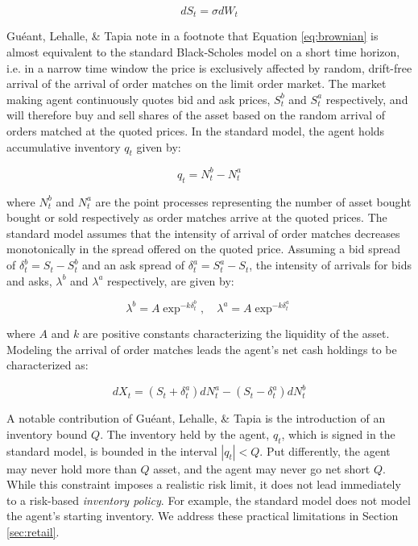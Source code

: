 \documentclass{article}
\begin{document}
\begin{equation}
\label{eq:brownian}
dS_{t} = \sigma dW_{t}
\end{equation}

Guéant, Lehalle, \& Tapia note in a footnote that Equation \ref{eq:brownian} is almost equivalent to the standard Black-Scholes model on a short time horizon, i.e. in a narrow time window the price is exclusively affected by random, drift-free arrival of the arrival of order matches on the limit order market. The market making agent continuously quotes bid and ask prices, $S^b_t$ and $S^a_t$ respectively, and will therefore buy and sell shares of the asset based on the random arrival of orders matched at the quoted prices. In the standard model, the agent holds accumulative inventory $q_t$ given by:

\begin{equation}
\label{eq:inventory}
q_{t} = N^b_{t} - N^a_{t}
\end{equation}

where $N^b_{t}$ and $N^a_{t}$ are the point processes representing the number of asset bought bought or sold respectively as order matches arrive at the quoted prices. The standard model assumes that the intensity of arrival of order matches decreases monotonically in the spread offered on the quoted price. Assuming a bid spread of $\delta^b_t = S_t - S^b_t$ and an ask spread of $\delta^a_t = S^a_t - S_t$, the intensity of arrivals for bids and asks, $\lambda^b$ and $\lambda^a$ respectively, are given by:

\begin{equation}
\label{eq:arrival}
\lambda^b = A \exp^{-k \delta^b_t}, \quad
\lambda^a = A \exp^{-k \delta^a_t}
\end{equation}

where $A$ and $k$ are positive constants characterizing the liquidity of the asset. Modeling the arrival of order matches leads the agent's net cash holdings to be characterized as:

\begin{equation}
\label{eq:cash}
dX_t = ( S_t + \delta^a_t ) dN^a_t - ( S_t - \delta^a_t ) dN^b_t
\end{equation}

A notable contribution of Guéant, Lehalle, \& Tapia is the introduction of an inventory bound $Q$. The inventory held by the agent, $q_t$, which is signed in the standard model, is bounded in the interval $|q_t| < Q$. Put differently, the agent may never hold more than $Q$ asset, and the agent may never go net short $Q$. While this constraint imposes a realistic risk limit, it does not lead immediately to a risk-based \emph{inventory policy}. For example, the standard model does not model the agent's starting inventory. We address these practical limitations in Section \ref{sec:retail}.
\end{document}
